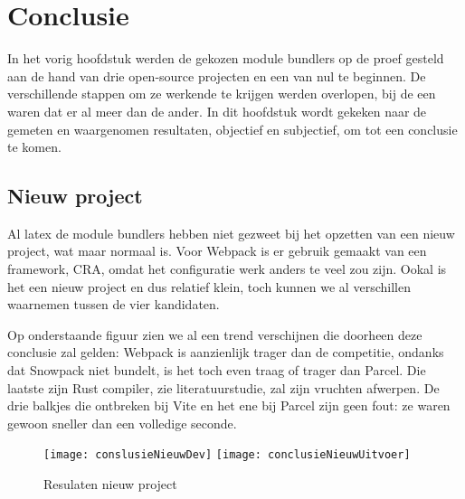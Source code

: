 
\chapter{Conclusie}
\label{ch:conclusie}


In het vorig hoofdstuk werden de gekozen module bundlers op de proef gesteld aan de hand van drie open-source projecten en een van nul te beginnen. De verschillende stappen om ze werkende te krijgen werden overlopen, bij de een waren dat er al meer dan de ander. In dit hoofdstuk wordt gekeken naar de gemeten en waargenomen resultaten, objectief en subjectief, om tot een conclusie te komen.

\section{Nieuw project}

Al \gls{latex} de module bundlers hebben niet gezweet bij het opzetten van een nieuw project, wat maar normaal is. Voor Webpack is er gebruik gemaakt van een framework, CRA, omdat het configuratie werk anders te veel zou zijn. Ookal is het een nieuw project en dus relatief klein, toch kunnen we al verschillen waarnemen tussen de vier kandidaten. 

Op onderstaande figuur zien we al een trend verschijnen die doorheen deze conclusie zal gelden: Webpack is aanzienlijk trager dan de competitie, ondanks dat Snowpack niet bundelt, is het toch even traag of trager dan Parcel. Die laatste zijn Rust compiler, zie literatuurstudie, zal zijn vruchten afwerpen. De drie balkjes die ontbreken bij Vite en het ene bij Parcel zijn geen fout: ze waren gewoon sneller dan een volledige seconde. 

\begin{figure}[h]
    \texttt{[image: conslusieNieuwDev]}
        \centering
        \texttt{[image: conclusieNieuwUitvoer]}
        \centering
        \caption{Resulaten nieuw project}
    \end{figure}



